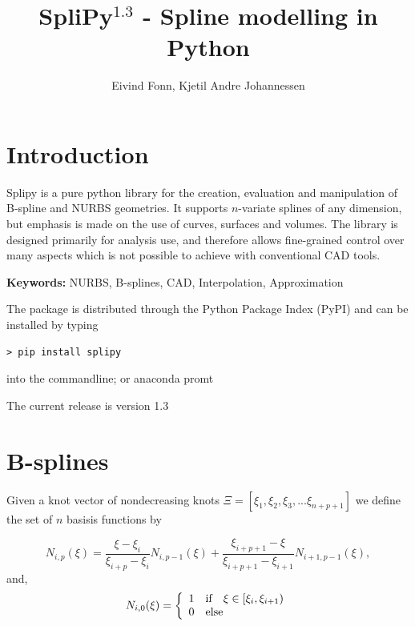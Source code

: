 \documentclass[landscape]{sintefposter}
\title{SpliPy$^{1.3}$ - Spline modelling in Python}
\author{Eivind Fonn, Kjetil Andre Johannessen }
\institute{SINTEF Digital, Dept. of Mathematics and Cybernetics, Trondheim, Norway}
\begin{document}
\maketitle

\begin{multicols}{3}
\section*{Introduction}
\begin{tcolorbox}[colback=sintefblue!10!white,colframe=sintefblue,title=Abstract]
  Splipy is a pure python library for the creation, evaluation and manipulation of B-spline and NURBS geometries.
  It supports $n$-variate splines of any dimension, but emphasis is made on the use of curves, surfaces and volumes.
  The library is designed primarily for analysis use, and therefore allows fine-grained control over many aspects which is not possible to achieve with conventional CAD tools.
\end{tcolorbox}
\textbf{Keywords:} NURBS, B-splines, CAD, Interpolation, Approximation
\vspace{2cm}

\begin{tcolorbox}[colback=white,colframe=sintefblue,title=Installation]
  The package is distributed through the Python Package Index (PyPI) and can be installed by typing
  \begin{tcolorbox}[colback=sinteflightgrey]
  \begin{verbatim}
> pip install splipy \end{verbatim}
  \end{tcolorbox}
  into the commandline; or anaconda promt
\end{tcolorbox}
The current release is version 1.3

\section{B-splines}
Given a knot vector of nondecreasing knots $\Xi=[\xi_1, \xi_2, \xi_3, ... \xi_{n+p+1}]$ we define the set of $n$ basisis functions by
\begin{tcolorbox}[colback=sintefblue!10!white,colframe=sintefblue,title=The basis]
  \begin{equation}
    \label{eq:bspline}
    N_{i,p}(\xi) = \frac{\xi - \xi_i}{\xi_{i+p}-\xi_i}N_{i,p-1}(\xi) + \frac{\xi_{i+p+1}-\xi}{\xi_{i+p+1}-\xi_{i+1}}N_{i+1,p-1}(\xi),
  \end{equation}
  and,
  \begin{equation}
    \label{eq:bspline-start}
    N_{i,0}(\xi) = \left\{
    \begin{array}{ll}
      1  &  $if $ \ \ \xi \in [\xi_i, \xi_{i+1}) \\
      0  &  $else$
    \end{array}
    \right.
  \end{equation}
\end{tcolorbox}


\end{multicols}
\end{document}
